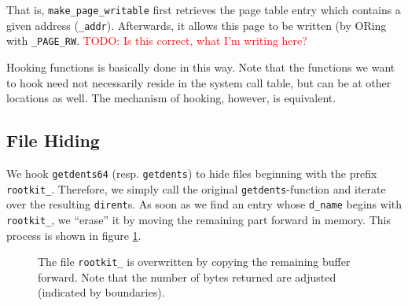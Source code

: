 \documentclass[10pt, letterpaper]{article}
\newcommand{\todo}[1]{\textcolor{red}{TODO: #1}}
\begin{document}
That is, \texttt{make\_page\_writable} first retrieves the page table entry which contains a given address (\texttt{\_addr}). Afterwards, it allows this page to be written (by ORing with \texttt{\_PAGE\_RW}. \todo{Is this correct, what I'm writing here?}

Hooking functions is basically done in this way. Note that the functions we want to hook need not necessarily reside in the system call table, but can be at other locations as well. The mechanism of hooking, however, is equivalent.

\subsection{File Hiding}
\label{filehiding}
We hook \texttt{getdents64} (resp. \texttt{getdents}) to hide files beginning with the prefix \texttt{rootkit\_}. 
Therefore, we simply call the original \texttt{getdents}-function and iterate over the resulting
\texttt{dirent}s. As soon as we find an entry whose \texttt{d\_name} begins with \texttt{rootkit\_},
we ``erase'' it by moving the remaining part forward in memory. This process is shown in figure \ref{fig:filehiding}.


\begin{figure}[t]
\centering
{}
\caption{The file \texttt{rootkit\_} is overwritten by copying the remaining buffer forward. Note that the number of bytes returned are adjusted (indicated by boundaries).}
\label{fig:filehiding}
\end{figure}
\end{document}
